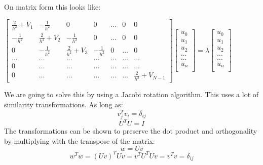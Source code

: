 \documentclass[10pt,a4paper]{article}
\begin{document}
\noindent On matrix form this looks like:

\begin{center}


$
 \begin{bmatrix}
 \frac{2}{h^2}+V_1 & -\frac{1}{h^2} & 0   & 0    & \dots  &0     & 0 \\
 -\frac{1}{h^2} & \frac{2}{h^2}+V_2 & -\frac{1}{h^2} & 0    & \dots  &0     &0 \\
  0   & -\frac{1}{h^2} & \frac{2}{h^2}+V_3 & -\frac{1}{h^2}  &0       &\dots & 0\\
  \dots  & \dots & \dots & \dots  &\dots      &\dots & \dots\\
  0   & \dots & \dots & \dots  &\dots  &\dots & \dots\\
 0   & \dots & \dots & \dots  &\dots       & \dots & \frac{2}{h^2}+V_{N-1}
             \end{bmatrix}
             \begin{bmatrix}
             u_0\\
             u_1\\
             u_2\\
             \dots\\
             \dots\\
             u_n\\
             \end{bmatrix} =\lambda
             \begin{bmatrix}
              u_0\\
             u_1\\
             u_2\\
             \dots\\
             \dots\\
             u_n\\
             \end{bmatrix}
$
\end{center}
We are going to solve this by using a Jacobi rotation algorithm. This uses a lot of similarity transformations. As long as:
$$v_j^Tv_i=\delta_{i j}$$
$$U^TU=I$$
The transformations can be shown to preserve the dot product and orthogonality by multiplying with the transpose of the matrix:
$$w=Uv$$
$$w^Tw=(Uv)^TUv=v^TU^TUv=v^Tv=\delta_{i j}$$
\end{document}

